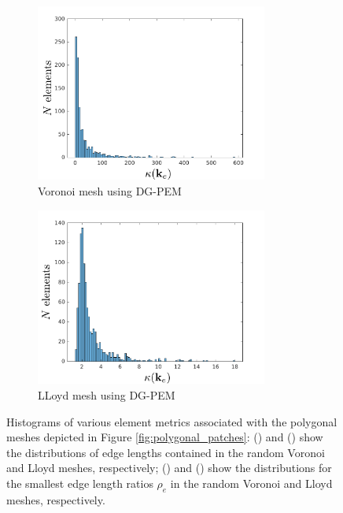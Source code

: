 \begin{figure}[!h]
\begin{subfigure}[b]{0.49\linewidth}
    \end{subfigure}
    \begin{subfigure}[b]{0.49\linewidth}
            \centering
            \includegraphics[width=3.0in]{figures/patch_condition_number_DGPEM.pdf}
    			\caption{Voronoi mesh using DG-PEM \label{fig:patch_condition_number_DGPEM}}
    \end{subfigure}
	\begin{subfigure}[b]{0.49\linewidth}
            \centering
            \includegraphics[width=3.0in]{figures/lloyd_condition_number_DGPEM.pdf}
    			\caption{LLoyd mesh using DG-PEM \label{fig:lloyd_condition_number_DGPEM}}
    \end{subfigure}
    \caption{Histograms of various element metrics associated with the polygonal meshes depicted in Figure \ref{fig:polygonal_patches}:  () and () show the distributions of edge lengths contained in the random Voronoi and Lloyd meshes, respectively; () and () show the distributions for the smallest edge length ratios $\rho_e$ in the random Voronoi and Lloyd meshes, respectively.}
\end{figure}


